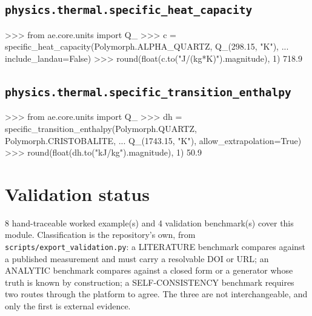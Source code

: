 \documentclass[10pt,a4paper,twoside]{report}
\begin{document}
\subsection*{\texttt{physics.thermal.specific\_heat\_capacity}}

\begin{doctestblock}
>>> from ae.core.units import Q_
>>> c = specific_heat_capacity(Polymorph.ALPHA_QUARTZ, Q_(298.15, "K"),
...                            include_landau=False)
>>> round(float(c.to("J/(kg*K)").magnitude), 1)
718.9
\end{doctestblock}

\subsection*{\texttt{physics.thermal.specific\_transition\_enthalpy}}

\begin{doctestblock}
>>> from ae.core.units import Q_
>>> dh = specific_transition_enthalpy(Polymorph.QUARTZ, Polymorph.CRISTOBALITE,
...                                    Q_(1743.15, "K"), allow_extrapolation=True)
>>> round(float(dh.to("kJ/kg").magnitude), 1)
50.9
\end{doctestblock}

\section{Validation status}

8 hand-traceable worked example(s) and 4 validation benchmark(s) cover this module. Classification is the repository's own, from \texttt{scripts/export\_validation.py}: a LITERATURE benchmark compares against a published measurement and must carry a resolvable DOI or URL; an ANALYTIC benchmark compares against a closed form or a generator whose truth is known by construction; a SELF-CONSISTENCY benchmark requires two routes through the platform to agree. The three are not interchangeable, and only the first is external evidence.

\footnotesize
\end{document}
